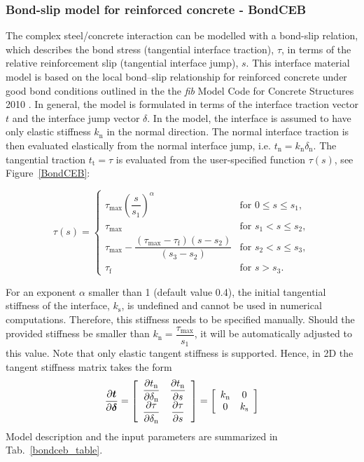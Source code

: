 \documentclass[a4paper]{article}
\newcommand{\mbf}[1]{\mbox{\boldmath$#1$}}
\begin{document}
\subsubsection{Bond-slip model for reinforced concrete - BondCEB}

The complex steel/concrete interaction can be modelled with a bond-slip relation, which describes the bond stress (tangential interface traction), $\tau$, in terms of the relative reinforcement slip (tangential interface jump), $s$. This interface material model is based on the local bond--slip relationship for reinforced concrete under good bond conditions outlined in the the \textit{fib} Model Code for Concrete Structures 2010 \cite{fib:2010}.
In general, the model is formulated in terms of the interface traction vector \mbf{t} and the interface jump vector \mbf{\delta}.
In the model, the interface is assumed to have only elastic stiffness $k_\text{n}$ in the normal direction. The normal interface traction is then evaluated elastically from the normal interface jump, i.e. $t_\text{n} =  k_\text{n} \delta_\text{n}$. The tangential traction $t_\text{t} = \tau$ is evaluated from the user-specified function $\tau (s)$, see Figure~\ref{BondCEB}:

\begin{equation}
\tau (s) = \begin{cases}
	\tau_\text{max} \left( \dfrac{s}{s_1} \right) ^ \alpha & \text{for } 0 \leq s \leq s_1, \\
	\tau_\text{max} & \text{for } s_1 < s \leq s_2, \\
	\tau_\text{max} - \dfrac{\left( \tau_\text{max} - \tau_\text{f} \right) \left(s-s_2 \right)}{\left( s_3 - s_2 \right)} & \text{for } s_2 < s \leq s_3, \\
	\tau_\text{f} & \text{for } s > s_3.
	\end{cases}
\end{equation}

\noindent For an exponent $\alpha$ smaller than 1 (default value 0.4), the initial tangential stiffness of the interface, $k_\text{s}$, is undefined and cannot be used in numerical computations. Therefore, this stiffness needs to be specified manually. Should the provided stiffness be smaller than $k_\text{n} = \dfrac{\tau_\text{max}}{s_1}$, it will be automatically adjusted to this value. Note that only elastic tangent stiffness is supported. Hence, in 2D the tangent stiffness matrix takes the form
\begin{equation}
\dfrac{\partial \mbf{t}}{\partial \mbf{\delta}}= \left[ \begin{array}{cc}
\dfrac{\partial t_\text{n}}{\partial \delta_\text{n}} &
\dfrac{\partial t_\text{n}}{\partial s} \\
\dfrac{\partial \tau}{\partial \delta_\text{n}} & \dfrac{\partial \tau}{\partial s}
\end{array} \right] =
\left[ \begin{array}{cc}
k_\text{n} & 0 \\ 0 & k_\text{s}
\end{array} \right]
\end{equation}
Model description and the input parameters are summarized in Tab.~\ref{bondceb_table}.
\end{document}
